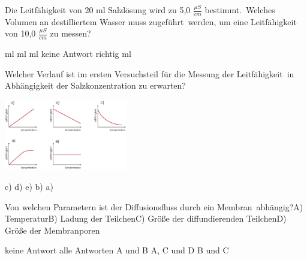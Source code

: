 \documentclass[11pt]{exam}
\begin{document}
\setlength{\voffset}{-0.5in}
\setlength{\headsep}{5pt}

\hspace{2mm}
 \hspace{5mm}
\vspace{4mm}

\begin{questions}

\question Die Leitfähigkeit von 20 ml Salzlösung wird zu 5,0 \( \frac{\mu S}{cm} \) bestimmt. Welches Volumen an destilliertem Wasser muss zugeführt werden, um eine Leitfähigkeit von 10,0 \( \frac{\mu S}{cm} \) zu messen?

\begin{choices}
	 ml
	 ml
	 ml
	\choice keine Antwort richtig
	 ml
\end{choices}

\vspace{3mm}\question Welcher Verlauf ist im ersten Versuchsteil für die Messung der Leitfähigkeit in Abhängigkeit der Salzkonzentration zu erwarten? 

\includegraphics[width=0.4\textwidth]{images/Leitfaehigkeit.png}

\begin{choices}
	\choice c)
	\choice d)
	\choice e)
	\choice b)
	\choice a)
\end{choices}

\vspace{3mm}\question Von welchen Parametern ist der Diffusionsfluss durch ein Membran abhängig?A) TemperaturB) Ladung der TeilchenC) Größe der diffundierenden TeilchenD) Größe der Membranporen

\begin{choices}
	\choice keine Antwort
	\choice alle Antworten
	\choice A und B
	\choice A, C und D
	\choice B und C
\end{choices}


\end{questions}
\end{document}
